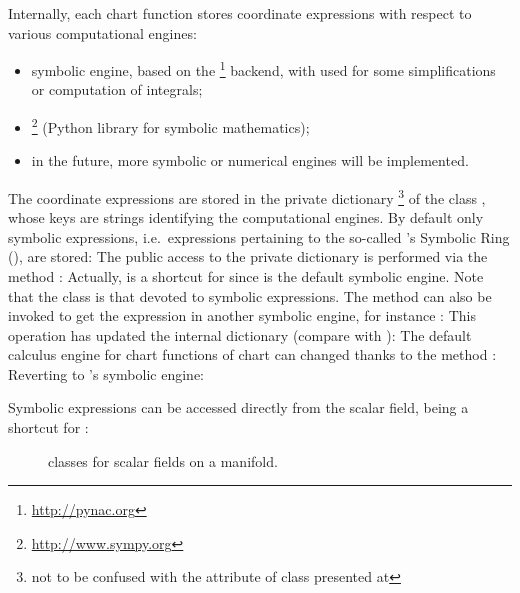 Internally, each chart function stores coordinate expressions with respect
to various computational engines:
\begin{itemize}
\item \Sage{} symbolic engine, based on the \footnote{\url{http://pynac.org}} backend, with  used for some simplifications
or computation of integrals;
\item {}\footnote{\url{http://www.sympy.org}} (Python library for symbolic mathematics);
\item in the future, more symbolic or numerical engines will be implemented.
\end{itemize}
The coordinate expressions are stored in the private dictionary \footnote{not to be confused with
the attribute  of class  presented
at }
of the class ,
whose keys are strings identifying the computational engines. By default
only \Sage{} symbolic expressions, i.e.\ expressions pertaining
to the so-called \Sage{}'s Symbolic Ring (),
are stored:
The public access to the private dictionary  is performed via the
method :
Actually,  is a shortcut for  since
 is the default symbolic engine. Note that the class
 is that devoted to \Sage{} symbolic expressions.
The method  can also be invoked to get the expression in
another symbolic engine, for instance :
This operation has updated the internal dictionary 
(compare with ):
The default calculus engine for chart functions of chart  can
changed thanks to the method :
Reverting to \Sage{}'s symbolic engine:

Symbolic expressions can be accessed directly from the scalar field,
 being a shortcut for :

\begin{figure}
\begin{center}

\end{center}
\caption{\label{f:man:scalar_classes}\footnotesize
\Sage{} classes for scalar fields on a manifold.}
\end{figure}

